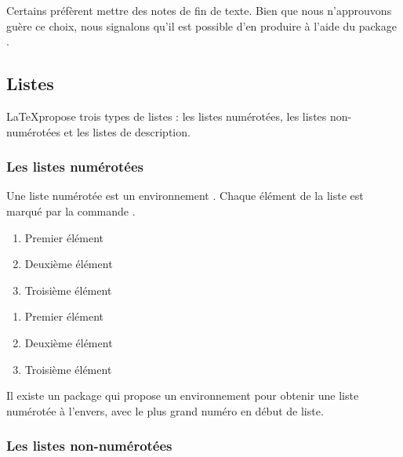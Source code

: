 \begin{plusloins}
    Certains préfèrent mettre des notes de fin de texte. Bien que nous n'approuvons guère ce choix, nous signalons qu'il est possible d'en produire à l'aide du package .
\end{plusloins}

\subsection{Listes}

\LaTeX propose trois types de listes : les listes numérotées, les listes non-numérotées et les listes de description.

\subsubsection{Les listes numérotées}

Une liste numérotée est un environnement .
Chaque élément de la liste est marqué par la commande .

\begin{latexcode}
\begin{enumerate}
    \item Premier élément
    \item Deuxième élément
    \item Troisième élément
\end{enumerate}
\end{latexcode}

\begin{quotation*}
\begin{enumerate}
    \item Premier élément
    \item Deuxième élément
    \item Troisième élément
\end{enumerate}
\end{quotation*}

\begin{plusloins}
Il existe un package  qui propose un environnement   pour obtenir une liste numérotée à l'envers, avec le plus grand numéro en début de liste.

\end{plusloins}
\subsubsection{Les listes non-numérotées}

